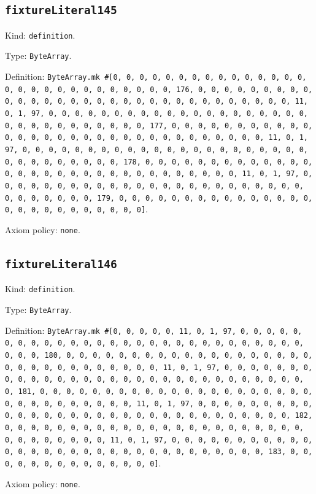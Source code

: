 \documentclass[11pt]{article}
\begin{document}
\subsection*{\texttt{fixtureLiteral145}}
\noindent Kind: \texttt{definition}.\par
\noindent Type: \texttt{ByteArray}.\par
\noindent Definition: \texttt{ByteArray.mk \#[0, 0, 0, 0, 0, 0, 0, 0, 0, 0, 0, 0, 0, 0, 0, 0, 0, 0, 0, 0, 0, 0, 0, 0, 0, 0, 0, 0, 176, 0, 0, 0, 0, 0, 0, 0, 0, 0, 0, 0, 0, 0, 0, 0, 0, 0, 0, 0, 0, 0, 0, 0, 0, 0, 0, 0, 0, 0, 0, 0, 11, 0, 1, 97, 0, 0, 0, 0, 0, 0, 0, 0, 0, 0, 0, 0, 0, 0, 0, 0, 0, 0, 0, 0, 0, 0, 0, 0, 0, 0, 0, 0, 0, 0, 0, 177, 0, 0, 0, 0, 0, 0, 0, 0, 0, 0, 0, 0, 0, 0, 0, 0, 0, 0, 0, 0, 0, 0, 0, 0, 0, 0, 0, 0, 0, 0, 0, 11, 0, 1, 97, 0, 0, 0, 0, 0, 0, 0, 0, 0, 0, 0, 0, 0, 0, 0, 0, 0, 0, 0, 0, 0, 0, 0, 0, 0, 0, 0, 0, 0, 0, 0, 178, 0, 0, 0, 0, 0, 0, 0, 0, 0, 0, 0, 0, 0, 0, 0, 0, 0, 0, 0, 0, 0, 0, 0, 0, 0, 0, 0, 0, 0, 0, 0, 11, 0, 1, 97, 0, 0, 0, 0, 0, 0, 0, 0, 0, 0, 0, 0, 0, 0, 0, 0, 0, 0, 0, 0, 0, 0, 0, 0, 0, 0, 0, 0, 0, 0, 0, 179, 0, 0, 0, 0, 0, 0, 0, 0, 0, 0, 0, 0, 0, 0, 0, 0, 0, 0, 0, 0, 0, 0, 0, 0, 0, 0]}.\par
\noindent Axiom policy: \texttt{none}.\par
\subsection*{\texttt{fixtureLiteral146}}
\noindent Kind: \texttt{definition}.\par
\noindent Type: \texttt{ByteArray}.\par
\noindent Definition: \texttt{ByteArray.mk \#[0, 0, 0, 0, 0, 11, 0, 1, 97, 0, 0, 0, 0, 0, 0, 0, 0, 0, 0, 0, 0, 0, 0, 0, 0, 0, 0, 0, 0, 0, 0, 0, 0, 0, 0, 0, 0, 0, 0, 0, 180, 0, 0, 0, 0, 0, 0, 0, 0, 0, 0, 0, 0, 0, 0, 0, 0, 0, 0, 0, 0, 0, 0, 0, 0, 0, 0, 0, 0, 0, 0, 0, 11, 0, 1, 97, 0, 0, 0, 0, 0, 0, 0, 0, 0, 0, 0, 0, 0, 0, 0, 0, 0, 0, 0, 0, 0, 0, 0, 0, 0, 0, 0, 0, 0, 0, 0, 181, 0, 0, 0, 0, 0, 0, 0, 0, 0, 0, 0, 0, 0, 0, 0, 0, 0, 0, 0, 0, 0, 0, 0, 0, 0, 0, 0, 0, 0, 0, 0, 11, 0, 1, 97, 0, 0, 0, 0, 0, 0, 0, 0, 0, 0, 0, 0, 0, 0, 0, 0, 0, 0, 0, 0, 0, 0, 0, 0, 0, 0, 0, 0, 0, 0, 0, 182, 0, 0, 0, 0, 0, 0, 0, 0, 0, 0, 0, 0, 0, 0, 0, 0, 0, 0, 0, 0, 0, 0, 0, 0, 0, 0, 0, 0, 0, 0, 0, 11, 0, 1, 97, 0, 0, 0, 0, 0, 0, 0, 0, 0, 0, 0, 0, 0, 0, 0, 0, 0, 0, 0, 0, 0, 0, 0, 0, 0, 0, 0, 0, 0, 0, 0, 183, 0, 0, 0, 0, 0, 0, 0, 0, 0, 0, 0, 0, 0, 0]}.\par
\noindent Axiom policy: \texttt{none}.\par
\end{document}
